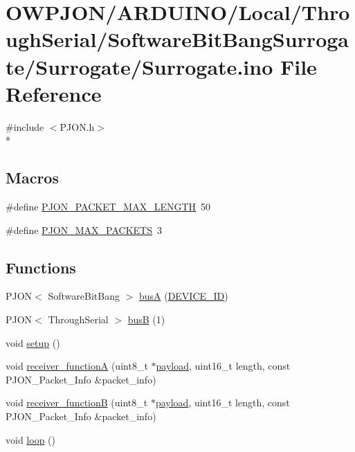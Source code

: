 \hypertarget{Surrogate_8ino}{\section{O\-W\-P\-J\-O\-N/\-A\-R\-D\-U\-I\-N\-O/\-Local/\-Through\-Serial/\-Software\-Bit\-Bang\-Surrogate/\-Surrogate/\-Surrogate.ino File Reference}
\label{Surrogate_8ino}
}
{\ttfamily \#include $<$P\-J\-O\-N.\-h$>$}\\*
\subsection*{Macros}
\begin{DoxyCompactItemize}
\item 
\#define \hyperlink{Surrogate_8ino_a58d21a16328181d94e377cb6dd32f680}{P\-J\-O\-N\-\_\-\-P\-A\-C\-K\-E\-T\-\_\-\-M\-A\-X\-\_\-\-L\-E\-N\-G\-T\-H}~50
\item 
\#define \hyperlink{Surrogate_8ino_af093da5eac99580be6ba61b4dc79f2c1}{P\-J\-O\-N\-\_\-\-M\-A\-X\-\_\-\-P\-A\-C\-K\-E\-T\-S}~3
\end{DoxyCompactItemize}
\subsection*{Functions}
\begin{DoxyCompactItemize}
\item 
P\-J\-O\-N$<$ Software\-Bit\-Bang $>$ \hyperlink{Surrogate_8ino_a3996eb0beabfbf03ec6f65281744698a}{bus\-A} (\hyperlink{Surrogate_8ino_ab626366a28e9f4d297a10d5958647f3a}{D\-E\-V\-I\-C\-E\-\_\-\-I\-D})
\item 
P\-J\-O\-N$<$ Through\-Serial $>$ \hyperlink{Surrogate_8ino_a4addaf9e46a29372ea7a59e3fc889833}{bus\-B} (1)
\item 
void \hyperlink{Surrogate_8ino_a4fc01d736fe50cf5b977f755b675f11d}{setup} ()
\item 
void \hyperlink{Surrogate_8ino_ac08d28e60bf73a1cecb88b0a20a4b77c}{receiver\-\_\-function\-A} (uint8\-\_\-t $\ast$\hyperlink{Uno__Dragino__LoRa__GPS__Shield__TTN_8ino_a78a402d1762842473567de90b11ed256}{payload}, uint16\-\_\-t length, const P\-J\-O\-N\-\_\-\-Packet\-\_\-\-Info \&packet\-\_\-info)
\item 
void \hyperlink{Surrogate_8ino_a957d4a297d3571c03bc1ab4617e6fd7b}{receiver\-\_\-function\-B} (uint8\-\_\-t $\ast$\hyperlink{Uno__Dragino__LoRa__GPS__Shield__TTN_8ino_a78a402d1762842473567de90b11ed256}{payload}, uint16\-\_\-t length, const P\-J\-O\-N\-\_\-\-Packet\-\_\-\-Info \&packet\-\_\-info)
\item 
void \hyperlink{Surrogate_8ino_afe461d27b9c48d5921c00d521181f12f}{loop} ()
\end{DoxyCompactItemize}
